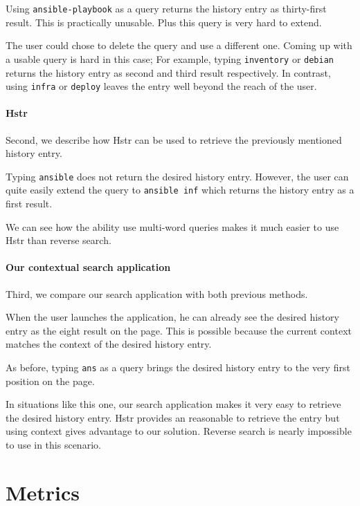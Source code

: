 Using \verb|ansible-playbook| as a query returns the history entry as thirty-first result. This is practically unusable. Plus this query is very hard to extend.

The user could chose to delete the query and use a different one. Coming up with a usable query is hard in this case; For example, typing \verb|inventory| or \verb|debian| returns the history entry as second and third result respectively. In contrast, using \verb|infra| or \verb|deploy| leaves the entry well beyond the reach of the user. 

\paragraph{Hstr}
Second, we describe how Hstr can be used to retrieve the previously mentioned history entry.

Typing \verb|ansible| does not return the desired history entry. However, the user can quite easily extend the query to \verb|ansible inf| which returns the history entry as a first result. 

We can see how the ability use multi-word queries makes it much easier to use Hstr than reverse search.

\paragraph{Our contextual search application}

Third, we compare our search application with both previous methods. 

When the user launches the application, he can already see the desired history entry as the eight result on the page. This is possible because the current context matches the context of the desired history entry. 

As before, typing \verb|ans| as a query brings the desired history entry to the very first position on the page. 

In situations like this one, our search application makes it very easy to retrieve the desired history entry. Hstr provides an reasonable to retrieve the entry but using context gives advantage to our solution. Reverse search is nearly impossible to use in this scenario.



\section{Metrics}

